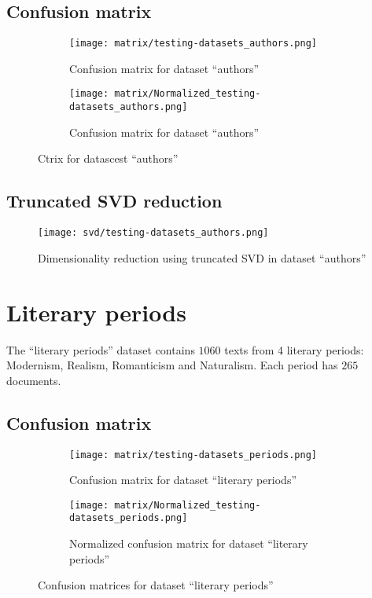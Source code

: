 \documentclass[\main/main.tex]{subfiles}
\begin{document}
\subsection{Confusion matrix}
\begin{figure}
	\begin{subfigure}{0.40\textwidth}
		\texttt{[image: matrix/testing-datasets\_authors.png]}
		\caption{Confusion matrix for dataset ``authors''}
	\end{subfigure}
	\begin{subfigure}{0.40\textwidth}
		\texttt{[image: matrix/Normalized\_testing-datasets\_authors.png]}
		\caption{Confusion matrix for dataset ``authors''}
	\end{subfigure}
	\caption{Ctrix for datascest ``authors''}
\end{figure}
\subsection{Truncated SVD reduction}
\begin{figure}
	\texttt{[image: svd/testing-datasets\_authors.png]}
	\caption{Dimensionality reduction using truncated SVD in dataset ``authors''}
\end{figure}

\clearpage
\section{Literary periods}
The ``literary periods'' dataset contains \(1060\) texts from 4 literary periods: Modernism, Realism, Romanticism and Naturalism. Each period has \(265\) documents.
\subsection{Confusion matrix}
\begin{figure}
	\begin{subfigure}{0.40\textwidth}
		\texttt{[image: matrix/testing-datasets\_periods.png]}
		\caption{Confusion matrix for dataset ``literary periods''}
	\end{subfigure}
	\begin{subfigure}{0.40\textwidth}
		\texttt{[image: matrix/Normalized\_testing-datasets\_periods.png]}
		\caption{Normalized confusion matrix for dataset ``literary periods''}
	\end{subfigure}
	\caption{Confusion matrices for dataset ``literary periods''}
\end{figure}
\end{document}
